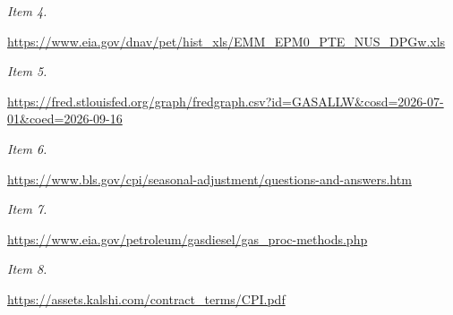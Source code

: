 \documentclass[11pt]{article}
\begin{document}
\par\noindent\textit{Item 4.}\par \href{https://www.eia.gov/dnav/pet/hist\_xls/EMM\_EPM0\_PTE\_NUS\_DPGw.xls}{https://www.\hspace{0pt}eia.gov/dnav\hspace{0pt}/pet/hist\_xl\hspace{0pt}s/EMM\_EPM0\_P\hspace{0pt}TE\_NUS\_DPGw.\hspace{0pt}xls}

\par\noindent\textit{Item 5.}\par \href{https://fred.stlouisfed.org/graph/fredgraph.csv?id=GASALLW\&cosd=2026-07-01\&coed=2026-09-16}{https://fred\hspace{0pt}.stlouisfed.\hspace{0pt}org/graph/fr\hspace{0pt}edgraph.csv?\hspace{0pt}id=GASALLW\&c\hspace{0pt}osd=2026-07-\hspace{0pt}01\&coed=2026\hspace{0pt}-09-16}

\par\noindent\textit{Item 6.}\par \href{https://www.bls.gov/cpi/seasonal-adjustment/questions-and-answers.htm}{https://www.\hspace{0pt}bls.gov/cpi/\hspace{0pt}seasonal-adj\hspace{0pt}ustment/ques\hspace{0pt}tions-and-an\hspace{0pt}swers.htm}

\par\noindent\textit{Item 7.}\par \href{https://www.eia.gov/petroleum/gasdiesel/gas\_proc-methods.php}{https://www.\hspace{0pt}eia.gov/petr\hspace{0pt}oleum/gasdie\hspace{0pt}sel/gas\_proc\hspace{0pt}-methods.php}

\par\noindent\textit{Item 8.}\par \href{https://assets.kalshi.com/contract\_terms/CPI.pdf}{https://asse\hspace{0pt}ts.kalshi.co\hspace{0pt}m/contract\_t\hspace{0pt}erms/CPI.pdf}
\end{document}
